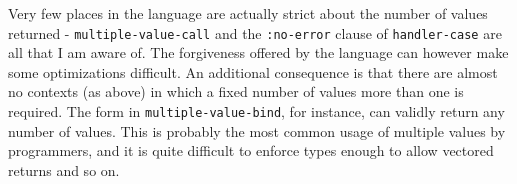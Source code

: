\documentclass{article}
\begin{document}
Very few places in the language are actually strict about the number of values returned - \texttt{multiple-value-call} and the \texttt{:no-error} clause of \texttt{handler-case} are all that I am aware of. The forgiveness offered by the language can however make some optimizations difficult. An additional consequence is that there are almost no contexts (as above) in which a fixed number of values more than one is required. The form in \texttt{multiple-value-bind}, for instance, can validly return any number of values. This is probably the most common usage of multiple values by programmers, and it is quite difficult to enforce types enough to allow vectored returns and so on.
\end{document}
